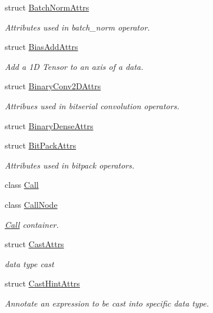 \begin{DoxyCompactItemize}
struct \hyperlink{structtvm_1_1relay_1_1BatchNormAttrs}{Batch\+Norm\+Attrs}
\begin{DoxyCompactList}\small\item\em Attributes used in batch\+\_\+norm operator. \end{DoxyCompactList}\item 
struct \hyperlink{structtvm_1_1relay_1_1BiasAddAttrs}{Bias\+Add\+Attrs}
\begin{DoxyCompactList}\small\item\em Add a 1D Tensor to an axis of a data. \end{DoxyCompactList}\item 
struct \hyperlink{structtvm_1_1relay_1_1BinaryConv2DAttrs}{Binary\+Conv2\+D\+Attrs}
\begin{DoxyCompactList}\small\item\em Attribues used in bitserial convolution operators. \end{DoxyCompactList}\item 
struct \hyperlink{structtvm_1_1relay_1_1BinaryDenseAttrs}{Binary\+Dense\+Attrs}
\item 
struct \hyperlink{structtvm_1_1relay_1_1BitPackAttrs}{Bit\+Pack\+Attrs}
\begin{DoxyCompactList}\small\item\em Attributes used in bitpack operators. \end{DoxyCompactList}\item 
class \hyperlink{classtvm_1_1relay_1_1Call}{Call}
\item 
class \hyperlink{classtvm_1_1relay_1_1CallNode}{Call\+Node}
\begin{DoxyCompactList}\small\item\em \hyperlink{classtvm_1_1relay_1_1Call}{Call} container. \end{DoxyCompactList}\item 
struct \hyperlink{structtvm_1_1relay_1_1CastAttrs}{Cast\+Attrs}
\begin{DoxyCompactList}\small\item\em data type cast \end{DoxyCompactList}\item 
struct \hyperlink{structtvm_1_1relay_1_1CastHintAttrs}{Cast\+Hint\+Attrs}
\begin{DoxyCompactList}\small\item\em Annotate an expression to be cast into specific data type. \end{DoxyCompactList}\item 

\end{DoxyCompactItemize}
